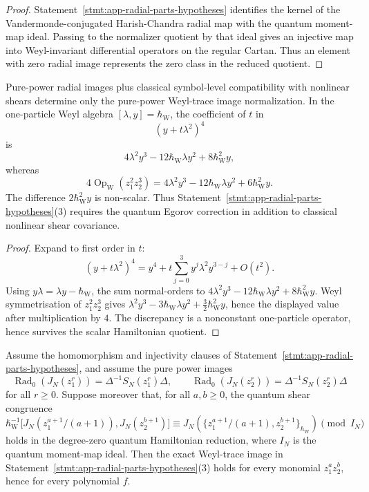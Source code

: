 \begin{proof}
  Statement~\ref{stmt:app-radial-parts-hypotheses} identifies the kernel
  of the Vandermonde-conjugated Harish-Chandra radial map with the
  quantum moment-map ideal.  Passing to the normalizer quotient by that
  ideal gives an injective map into Weyl-invariant differential
  operators on the regular Cartan.  Thus an element with zero radial
  image represents the zero class in the reduced quotient.
\end{proof}

\begin{lem}
\label{lem:app-radial-nonlinear-shear-obstruction}
  Pure-power radial images plus classical symbol-level compatibility
  with nonlinear shears determine only the pure-power Weyl-trace image
  normalization.  In the one-particle Weyl algebra
  \([\lambda,y]=\hbar_{\mathrm{W}}\), the coefficient of \(t\) in
  \[
    (y+t\lambda^2)^4
  \]
  is
  \[
    4\lambda^2y^3-12\hbar_{\mathrm{W}}\lambda y^2+8\hbar_{\mathrm{W}}^2 y,
  \]
  whereas
  \[
    4\operatorname{Op}_{\mathrm W}(z_1^2z_2^3)
    =
    4\lambda^2y^3-12\hbar_{\mathrm{W}}\lambda y^2+6\hbar_{\mathrm{W}}^2 y.
  \]
  The difference \(2\hbar_{\mathrm{W}}^2y\) is non-scalar.  Thus
  Statement~\ref{stmt:app-radial-parts-hypotheses}(3) requires the quantum
  Egorov correction in addition to classical nonlinear shear covariance.
\end{lem}

\begin{proof}
  Expand to first order in \(t\):
  \[
    (y+t\lambda^2)^4
    =
    y^4+t\sum_{j=0}^3 y^j\lambda^2y^{3-j}+O(t^2).
  \]
  Using \(y\lambda=\lambda y-\hbar_{\mathrm{W}}\), the sum normal-orders to
  \(4\lambda^2y^3-12\hbar_{\mathrm{W}}\lambda y^2+8\hbar_{\mathrm{W}}^2y\).
  Weyl symmetrisation of \(z_1^2z_2^3\) gives
  \(\lambda^2y^3-3\hbar_{\mathrm{W}}\lambda y^2+\frac32\hbar_{\mathrm{W}}^2y\), hence the
  displayed value after multiplication by \(4\).  The discrepancy is a
  nonconstant one-particle operator, hence survives the scalar
  Hamiltonian quotient.
\end{proof}

\begin{prop}\label{prop:app-quantum-shear-suffices-radial-image}
  Assume the homomorphism and injectivity clauses of
  Statement~\ref{stmt:app-radial-parts-hypotheses}, and assume the pure
  power images
  \[
    \operatorname{Rad}_0(J_N(z_1^r))=\Delta^{-1}S_N(z_1^r)\Delta,
    \qquad
    \operatorname{Rad}_0(J_N(z_2^r))=\Delta^{-1}S_N(z_2^r)\Delta
  \]
  for all \(r\geq0\).  Suppose moreover that, for all \(a,b\geq0\), the
  quantum shear congruence
  \[
    \hbar_{\mathrm{W}}^{-1}\bigl[
      J_N(z_1^{a+1}/(a+1)),J_N(z_2^{b+1})
    \bigr]
    \equiv
    J_N\!\left(
      \{z_1^{a+1}/(a+1),z_2^{b+1}\}_{\hbar_{\mathrm{W}}}
    \right)
    \pmod {I_N}
  \]
  holds in the degree-zero quantum Hamiltonian reduction, where \(I_N\)
  is the quantum moment-map ideal.  Then the exact Weyl-trace image in
  Statement~\ref{stmt:app-radial-parts-hypotheses}(3) holds for every
  monomial \(z_1^az_2^b\), hence for every polynomial \(f\).
\end{prop}

